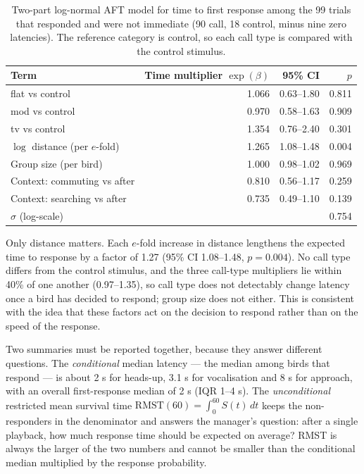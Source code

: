 \begin{table}[htbp]
  \centering
  \caption{Two-part log-normal AFT model for time to first response among the 99 trials that
  responded and were not immediate (90 call, 18 control, minus nine zero latencies). The reference
  category is control, so each call type is compared with the control stimulus.}\label{tab:q3-aft}
  \small
  \begin{tabular}{lrrr}
    \toprule
    Term & Time multiplier $\exp(\beta)$ & 95\% CI & $p$ \\
    \midrule
    flat vs control & 1.066 & 0.63--1.80 & 0.811 \\
    mod vs control & 0.970 & 0.58--1.63 & 0.909 \\
    tv vs control & 1.354 & 0.76--2.40 & 0.301 \\
    $\log$ distance (per $e$-fold) & 1.265 & 1.08--1.48 & 0.004 \\
    Group size (per bird) & 1.000 & 0.98--1.02 & 0.969 \\
    Context: commuting vs after & 0.810 & 0.56--1.17 & 0.259 \\
    Context: searching vs after & 0.735 & 0.49--1.10 & 0.139 \\
    \midrule
    $\sigma$ (log-scale) & \multicolumn{3}{r}{0.754} \\
    \bottomrule
  \end{tabular}
\end{table}

Only distance matters. Each $e$-fold increase in distance lengthens the expected time to
response by a factor of 1.27 (95\% CI 1.08--1.48, $p=0.004$). No call type differs from the
control stimulus, and the three call-type multipliers lie within 40\% of one another
(0.97--1.35), so call type does not detectably change latency once a bird has decided to respond;
group size does not either. This is consistent with the idea that these factors act on the
decision to respond rather than on the speed of the response.

Two summaries must be reported together, because they answer different questions. The
\emph{conditional} median latency --- the median among birds that respond --- is about 2 s for
heads-up, 3.1 s for vocalisation and 8 s for approach, with an overall first-response median of
2 s (IQR 1--4 s). The \emph{unconditional} restricted mean survival time
$\mathrm{RMST}(60)=\int_0^{60}S(t)\,dt$ \cite{ref8} keeps the non-responders in the denominator and answers
the manager's question: after a single playback, how much response time should be expected on
average? RMST is always the larger of the two numbers and cannot be smaller than the conditional
median multiplied by the response probability.


